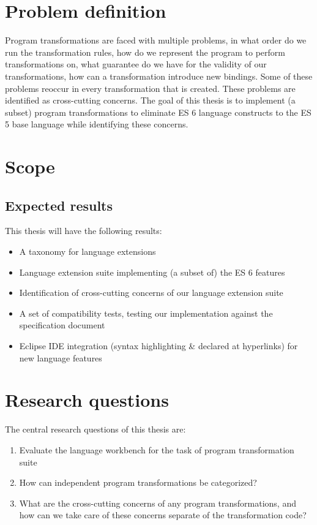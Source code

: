 \section{Problem definition}
Program transformations are faced with multiple problems, in what order do we run the transformation rules, how do we represent the program to perform transformations on, what guarantee do we have for the validity of our transformations, how can a transformation introduce new bindings.  
Some of these problems reoccur in every transformation that is created. These problems are identified as cross-cutting concerns. The goal of this thesis is to implement (a subset) program transformations to eliminate ES 6 language constructs to the ES 5 base language while identifying these concerns.

\section{Scope}

\subsection{Expected results}
This thesis will have the following results:
\begin{itemize}
	\item A taxonomy for language extensions
	\item Language extension suite implementing (a subset of) the ES 6 features
	\item Identification of cross-cutting concerns of our language extension suite
	\item A set of compatibility tests, testing our implementation against the specification document
	\item Eclipse IDE integration (syntax highlighting \& declared at hyperlinks) for new language features
\end{itemize}
\section{Research questions}
The central research questions of this thesis are:

\begin{enumerate}
	\item Evaluate the language workbench for the task of program transformation suite
	\item How can independent program transformations be categorized?
	\item What are the cross-cutting concerns of any program transformations, and how can we take care of these concerns separate of the transformation code?
\end{enumerate}

